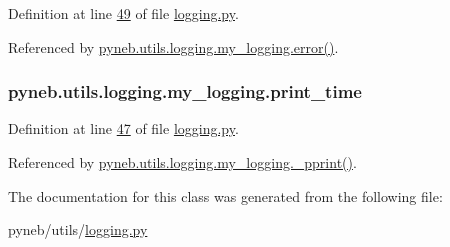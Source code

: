 Definition at line \hyperlink{logging_8py_source_l00049}{49} of file \hyperlink{logging_8py_source}{logging.\-py}.



Referenced by \hyperlink{logging_8py_source_l00099}{pyneb.\-utils.\-logging.\-my\-\_\-logging.\-error()}.

\hypertarget{classpyneb_1_1utils_1_1logging_1_1my__logging_aba4514cb95d832e8abf7f31f77c27606}{
\subsubsection[{print\-\_\-time}]{\setlength{\rightskip}{0pt plus 5cm}pyneb.\-utils.\-logging.\-my\-\_\-logging.\-print\-\_\-time}}\label{classpyneb_1_1utils_1_1logging_1_1my__logging_aba4514cb95d832e8abf7f31f77c27606}


Definition at line \hyperlink{logging_8py_source_l00047}{47} of file \hyperlink{logging_8py_source}{logging.\-py}.



Referenced by \hyperlink{logging_8py_source_l00051}{pyneb.\-utils.\-logging.\-my\-\_\-logging.\-\_\-pprint()}.



The documentation for this class was generated from the following file\-:\begin{DoxyCompactItemize}
\item 
pyneb/utils/\hyperlink{logging_8py}{logging.\-py}\end{DoxyCompactItemize}
